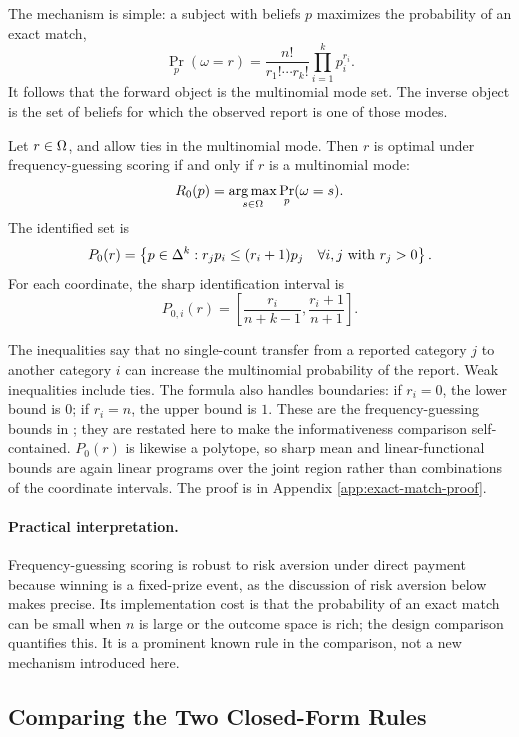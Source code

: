 The mechanism is simple: a subject with beliefs \(p\) maximizes the probability of an exact match,
\[
\Pr_p(\omega=r)
=
\frac{n!}{r_1!\cdots r_k!}\prod_{i=1}^k p_i^{r_i}.
\]
It follows that the forward object is the multinomial mode set.
The inverse object is the set of beliefs for which the observed report is one of those modes.

\begin{proposition}\label{prop:discrete}
Let \(r\in\Omega\), and allow ties in the multinomial mode.
Then \(r\) is optimal under frequency-guessing scoring if and only if \(r\) is a multinomial mode:
\[
R_0(p)
=
\operatorname*{arg\,max}_{s\in\Omega}\Pr_p(\omega=s).
\]
The identified set is
\[
P_0(r)
=
\left\{
p\in\Delta^k:
r_jp_i\le (r_i+1)p_j
\quad
\forall i,j\text{ with }r_j>0
\right\}.
\]
For each coordinate, the sharp identification interval is
\[
P_{0,i}(r)
=
\left[
\frac{r_i}{n+k-1},
\frac{r_i+1}{n+1}
\right].
\]
\end{proposition}

The inequalities say that no single-count transfer from a reported category \(j\) to another category \(i\) can increase the multinomial probability of the report.
Weak inequalities include ties.
The formula also handles boundaries: if \(r_i=0\), the lower bound is \(0\); if \(r_i=n\), the upper bound is \(1\).
These are the frequency-guessing bounds in \citet[Proposition~1]{SchlagTremewan2021}; they are restated here to make the informativeness comparison self-contained.
\(P_0(r)\) is likewise a polytope, so sharp mean and linear-functional bounds are again linear programs over the joint region rather than combinations of the coordinate intervals.
The proof is in Appendix \ref{app:exact-match-proof}.

\paragraph{Practical interpretation.}
Frequency-guessing scoring is robust to risk aversion under direct payment because winning is a fixed-prize event, as the discussion of risk aversion below makes precise.
Its implementation cost is that the probability of an exact match can be small when \(n\) is large or the outcome space is rich; the design comparison quantifies this.
It is a prominent known rule in the comparison, not a new mechanism introduced here.

\subsection{Comparing the Two Closed-Form Rules}


